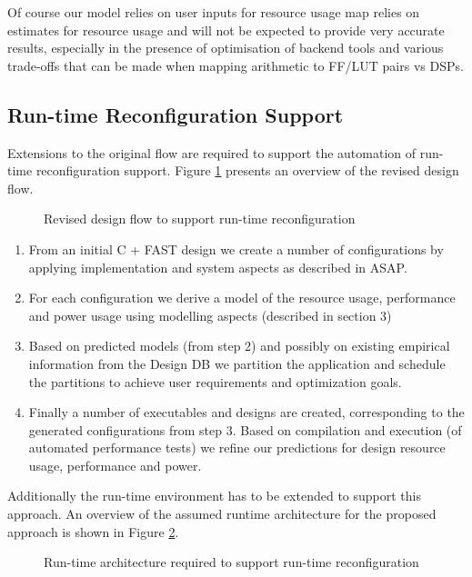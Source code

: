 Of course our model relies on user inputs for resource usage map
relies on estimates for resource usage and will not be expected to
provide very accurate results, especially in the presence of
optimisation of backend tools and various trade-offs that can be made
when mapping arithmetic to FF/LUT pairs vs DSPs.

\subsection{Run-time Reconfiguration Support}

Extensions to the original flow are required to support the automation
of run-time reconfiguration support. Figure
\ref{fig:reconfig-design-flow} presents an overview of the revised
design flow.

\begin{figure}[!ht]
  \centering
  \def\svgwidth{\textwidth}
  
  \caption{Revised design flow to support run-time reconfiguration}
  \label{fig:reconfig-design-flow}
\end{figure}

\begin{enumerate}
\item From an initial C + FAST design we create a number of
  configurations by applying implementation and system aspects as
  described in ASAP.
\item For each configuration we derive a model of the resource usage,
  performance and power usage using modelling aspects (described in
  section 3)
\item Based on predicted models (from step 2) and possibly on existing
  empirical information from the Design DB we partition the
  application and schedule the partitions to achieve user requirements
  and optimization goals.
\item Finally a number of executables and designs are created,
  corresponding to the generated configurations from step 3. Based on
  compilation and execution (of automated performance tests) we refine
  our predictions for design resource usage, performance and power.
\end{enumerate}

Additionally the run-time environment has to be extended to support
this approach. An overview of the assumed runtime architecture for the
proposed approach is shown in Figure \ref{fig:reconfig-runtime}.

\begin{figure}[!ht]
  \centering
  \def\svgwidth{\textwidth}
  
  \caption{Run-time architecture required to support run-time reconfiguration}
  \label{fig:reconfig-runtime}
\end{figure}

